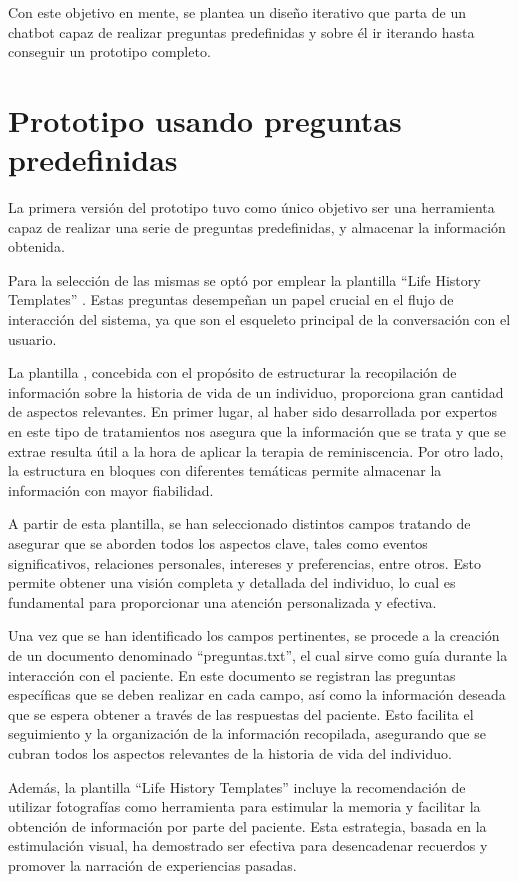 Con este objetivo en mente, se plantea un diseño iterativo que parta de un chatbot capaz de realizar preguntas predefinidas y sobre él ir iterando hasta conseguir un prototipo completo.

\section{Prototipo usando preguntas predefinidas}
\label{ssubsec:seleccionpreguntas}
La primera versión del prototipo tuvo como único objetivo ser una herramienta capaz de realizar una serie de preguntas predefinidas, y almacenar la información obtenida.

Para la selección de las mismas se optó por emplear la plantilla ``Life History Templates'' \cite{dementia}. Estas preguntas desempeñan un papel crucial en el flujo de interacción del sistema, ya que son el esqueleto principal de la conversación con el usuario. 

La plantilla \cite{dementia}, concebida con el propósito de estructurar la recopilación de información sobre la historia de vida de un individuo, proporciona gran cantidad de aspectos relevantes. En primer lugar, al haber sido desarrollada por expertos en este tipo de tratamientos nos asegura que la información que se trata y que se extrae resulta útil a la hora de aplicar la terapia de reminiscencia. Por otro lado, la estructura en bloques con diferentes temáticas permite almacenar la información con mayor fiabilidad. 

A partir de esta plantilla, se han seleccionado distintos campos tratando de asegurar que se aborden todos los aspectos clave, tales como eventos significativos, relaciones personales, intereses y preferencias, entre otros. Esto permite obtener una visión completa y detallada del individuo, lo cual es fundamental para proporcionar una atención personalizada y efectiva.

Una vez que se han identificado los campos pertinentes, se procede a la creación de un documento denominado ``preguntas.txt'', el cual sirve como guía durante la interacción con el paciente. En este documento se registran las preguntas específicas que se deben realizar en cada campo, así como la información deseada que se espera obtener a través de las respuestas del paciente. Esto facilita el seguimiento y la organización de la información recopilada, asegurando que se cubran todos los aspectos relevantes de la historia de vida del individuo.

Además, la plantilla ``Life History Templates'' incluye la recomendación de utilizar fotografías como herramienta para estimular la memoria y facilitar la obtención de información por parte del paciente. Esta estrategia, basada en la estimulación visual, ha demostrado ser efectiva para desencadenar recuerdos y promover la narración de experiencias pasadas.

